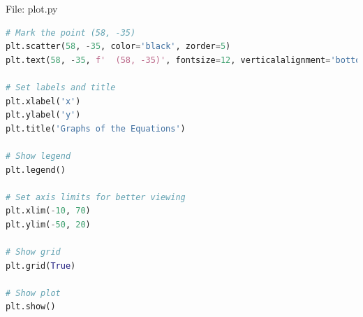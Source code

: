 \documentclass{beamer}
\numberwithin{equation}{section}
\theoremstyle{remark}
\begin{document}
\begin{frame}[fragile]{File: plot.py}
\begin{lstlisting}[language=Python]
# Mark the point (58, -35)
plt.scatter(58, -35, color='black', zorder=5)
plt.text(58, -35, f'  (58, -35)', fontsize=12, verticalalignment='bottom')

# Set labels and title
plt.xlabel('x')
plt.ylabel('y')
plt.title('Graphs of the Equations')

# Show legend
plt.legend()

# Set axis limits for better viewing
plt.xlim(-10, 70)
plt.ylim(-50, 20)

# Show grid
plt.grid(True)

# Show plot
plt.show()
\end{lstlisting}
\end{frame}
\end{document}
